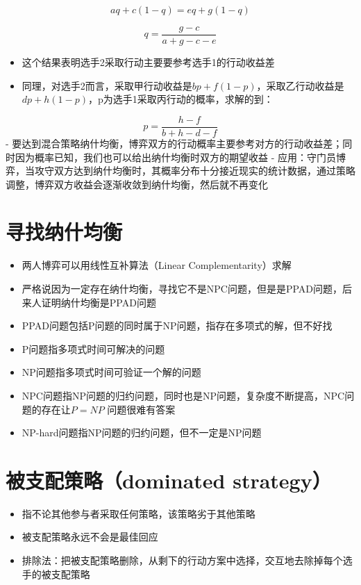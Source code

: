 \documentclass[
]{book}
\providecommand{\tightlist}{%
  \setlength{\itemsep}{0pt}\setlength{\parskip}{0pt}}
\begin{document}
\[aq+c(1-q) = eq+g(1-q)\]

\[q = \frac{g-c}{a+g-c-e}\]

\begin{itemize}
\tightlist
\item
  这个结果表明选手2采取行动主要要参考选手1的行动收益差
\item
  同理，对选手2而言，采取甲行动收益是\(bp+f(1-p)\)，采取乙行动收益是\(dp+h(1-p)\)，p为选手1采取丙行动的概率，求解的到：
\end{itemize}

\[p=\frac{h-f}{b+h-d-f}\]
- 要达到混合策略纳什均衡，博弈双方的行动概率主要参考对方的行动收益差；同时因为概率已知，我们也可以给出纳什均衡时双方的期望收益
- 应用：守门员博弈，当攻守双方达到纳什均衡时，其概率分布十分接近现实的统计数据，通过策略调整，博弈双方收益会逐渐收敛到纳什均衡，然后就不再变化

\hypertarget{ux5bfbux627eux7eb3ux4ec0ux5747ux8861}{%
\section{寻找纳什均衡}\label{ux5bfbux627eux7eb3ux4ec0ux5747ux8861}}

\begin{itemize}
\tightlist
\item
  两人博弈可以用线性互补算法（Linear Complementarity）求解
\item
  严格说因为一定存在纳什均衡，寻找它不是NPC问题，但是是PPAD问题，后来人证明纳什均衡是PPAD问题
\item
  PPAD问题包括P问题的同时属于NP问题，指存在多项式的解，但不好找
\item
  P问题指多项式时间可解决的问题
\item
  NP问题指多项式时间可验证一个解的问题
\item
  NPC问题指NP问题的归约问题，同时也是NP问题，复杂度不断提高，NPC问题的存在让\(P = NP\) 问题很难有答案
\item
  NP-hard问题指NP问题的归约问题，但不一定是NP问题
\end{itemize}

\hypertarget{ux88abux652fux914dux7b56ux7565dominated-strategy}{%
\section{被支配策略（dominated strategy）}\label{ux88abux652fux914dux7b56ux7565dominated-strategy}}

\begin{itemize}
\tightlist
\item
  指不论其他参与者采取任何策略，该策略劣于其他策略
\item
  被支配策略永远不会是最佳回应
\item
  排除法：把被支配策略删除，从剩下的行动方案中选择，交互地去除掉每个选手的被支配策略
\end{itemize}
\end{document}
